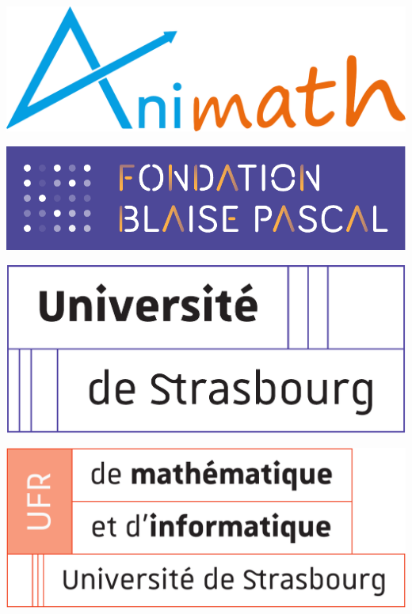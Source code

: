 {\singlespacing
\vfill
\hfill
\begin{minipage}[c]{6in}
    \hfill
    \begin{minipage}[c]{1.5in}
        \includegraphics[width=\linewidth]{logos/logo-animath-large.png}
    \end{minipage}
    \hfill
    \begin{minipage}[c]{1.5in}
        \includegraphics[width=1.3\linewidth]{logos/logo-fondation-blaise-pascal-fond-violet.pdf}
    \end{minipage}
    \hfill
    \vspace{1em}
    \vfill
    \begin{minipage}[c]{1.5in}
        \includegraphics[width=\linewidth]{logos/logo-unistra.pdf}
    \end{minipage}
    \hfill
    \hfill
    \begin{minipage}[c]{1.5in}
        \includegraphics[width=\linewidth]{logos/logo-ufr.pdf}

\end{minipage}
\end{minipage}}
